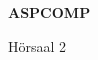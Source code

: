\documentclass[a4paper]{article}
\begin{document}
\printGenericVSLHeader
\begin{center}
\begin{vsltext}{3cm}{4cm}

   \vspace{0.5cm} 

    \textbf{ASPCOMP} 

    \vspace{1.5cm}

    Hörsaal 2

\end{vsltext}

\end{center}
\end{document}
